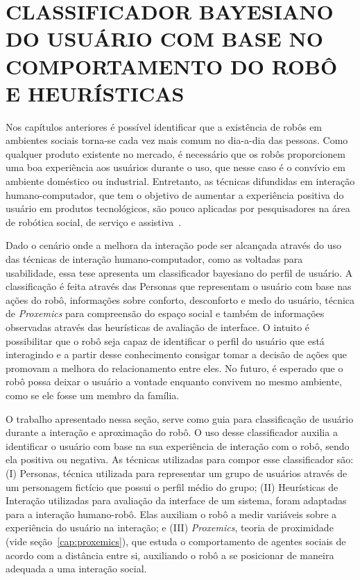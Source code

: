 \chapter{CLASSIFICADOR BAYESIANO DO USUÁRIO COM BASE NO COMPORTAMENTO DO ROBÔ E HEURÍSTICAS}
\label{cap:proposta}

Nos capítulos anteriores é possível identificar que a existência de robôs em ambientes sociais torna-se cada vez mais comum no dia-a-dia das pessoas. Como qualquer produto existente no mercado, é necessário que os robôs proporcionem uma boa experiência aos usuários durante o uso, que nesse caso é o convívio em ambiente doméstico ou industrial. Entretanto, as técnicas difundidas em interação humano-computador, que tem o objetivo de aumentar a experiência positiva do usuário em produtos tecnológicos, são pouco aplicadas por pesquisadores na área de robótica social, de serviço e assistiva~\cite{alenljung:2017}.

Dado o cenário onde a melhora da interação pode ser alcançada através do uso das técnicas de interação humano-computador, como as voltadas para usabilidade, essa tese apresenta um classificador bayesiano do perfil de usuário. A classificação é feita através das Personas que representam o usuário com base nas ações do robô, informações sobre conforto, desconforto e medo do usuário, técnica de \emph{Proxemics} para compreensão do espaço social e também de informações observadas através das heurísticas de avaliação de interface. O intuito é possibilitar que o robô seja capaz de identificar o perfil do usuário que está interagindo e a partir desse conhecimento consigar tomar a decisão de ações que promovam a melhora do relacionamento entre eles. No futuro, é esperado que o robô possa deixar o usuário a vontade enquanto convivem no mesmo ambiente, como se ele fosse um membro da família.

O trabalho apresentado nessa seção, serve como guia para classificação de usuário durante a interação e aproximação do robô. O uso desse classificador auxilia a identificar o usuário com base na sua experiência de interação com o robô, sendo ela positiva ou negativa. As técnicas utilizadas para compor esse classificador são: (I) Personas, técnica utilizada para representar um grupo de usuários através de um personagem fictício que possui o perfil médio do grupo; (II) Heurísticas de Interação utilizadas para avaliação da interface de um sistema, foram adaptadas para a interação humano-robô. Elas auxiliam o robô a medir variáveis sobre a experiência do usuário na interação; e (III) \emph{Proxemics}, teoria de proximidade (vide seção~\ref{cap:proxemics}), que estuda o comportamento de agentes sociais de acordo com a distância entre si, auxiliando o robô a se posicionar de maneira adequada a uma interação social.

